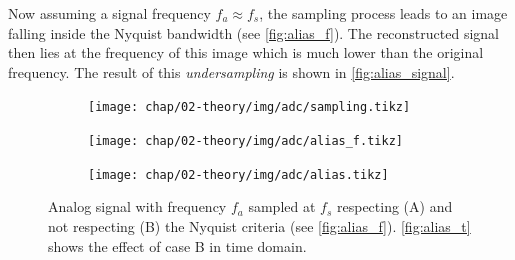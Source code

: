 Now assuming a signal frequency $f_a \approx f_s$, the sampling process leads to an image falling inside the Nyquist bandwidth (see \autoref{fig:alias_f}).
The reconstructed signal then lies at the frequency of this image which is much lower than the original frequency.
The result of this \textit{undersampling} is shown in \autoref{fig:alias_signal}. \cite{nyquist, shannon, walt}
\begin{figure}[tb]
	\centering
	\begin{subfigure}{\textwidth}
		\centering
		\texttt{[image: chap/02-theory/img/adc/sampling.tikz]}  
		\label{fig:sampling}
	\end{subfigure}
	\begin{subfigure}{\textwidth}
		\centering
		\texttt{[image: chap/02-theory/img/adc/alias\_f.tikz]}  
		\label{fig:alias_f}
	\end{subfigure}
	\begin{subfigure}{\textwidth}
		\centering
		\texttt{[image: chap/02-theory/img/adc/alias.tikz]}  
		\label{fig:alias_signal}
	\end{subfigure}

	\caption[Aliasing]{Analog signal with frequency $f_a$ sampled at $f_s$ respecting (A) and not respecting (B) the Nyquist criteria (see \autoref{fig:alias_f}). \autoref{fig:alias_t} shows the effect of case B in time domain. \cite{walt}}
	\label{fig:alias}
\end{figure}



